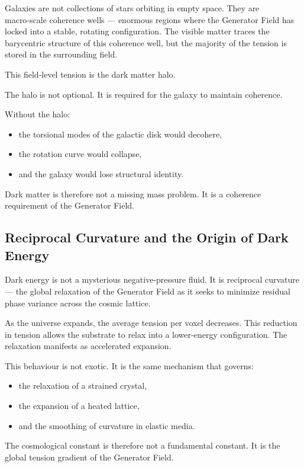 \documentclass[reprint,amsmath,amssymb,aps,prl,floatfix]{revtex4-2}
\begin{document}
\begin{itemize}
Galaxies are not collections of stars orbiting in empty space. They are macro‑scale coherence wells — enormous regions where the Generator Field has locked into a stable, rotating configuration. The visible matter traces the barycentric structure of this coherence well, but the majority of the tension is stored in the surrounding field.
\medskip

This field‑level tension is the dark matter halo.
\medskip

The halo is not optional.  
It is required for the galaxy to maintain coherence.
\medskip

Without the halo:
\begin{itemize}
\item the torsional modes of the galactic disk would decohere,  
\item the rotation curve would collapse,  
\item and the galaxy would lose structural identity.
\end{itemize}
\medskip

Dark matter is therefore not a missing mass problem.  
It is a coherence requirement of the Generator Field.

\subsection{Reciprocal Curvature and the Origin of Dark Energy}

Dark energy is not a mysterious negative‑pressure fluid.  
It is reciprocal curvature — the global relaxation of the Generator Field as it seeks to minimize residual phase variance across the cosmic lattice.
\medskip

As the universe expands, the average tension per voxel decreases. This reduction in tension allows the substrate to relax into a lower‑energy configuration. The relaxation manifests as accelerated expansion.
\medskip

This behaviour is not exotic.  
It is the same mechanism that governs:
\begin{itemize}
\item the relaxation of a strained crystal,  
\item the expansion of a heated lattice,  
\item and the smoothing of curvature in elastic media.
\end{itemize}
\medskip

The cosmological constant is therefore not a fundamental constant.  
It is the global tension gradient of the Generator Field.


\end{itemize}
\end{document}
